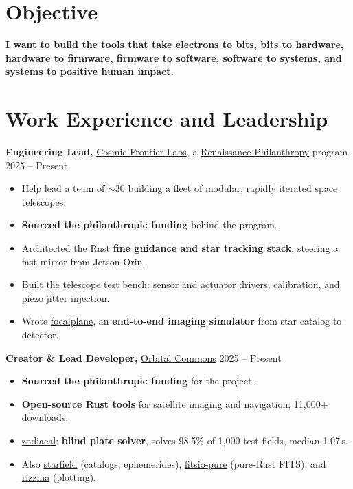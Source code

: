 \documentclass{res}
\let\oldsection\section
\renewcommand{\section}[1]{\needspace{4\baselineskip}\oldsection{#1}}
\begin{document}
\begin{resume}

\section{Objective}
\textbf{I want to build the tools that take electrons to bits, bits to hardware, hardware to firmware, 
firmware to software, software to systems, and systems to positive human impact.}

\section{Work Experience and Leadership}

{\bf Engineering Lead,} \href{https://www.cosmicfrontier.org}{Cosmic Frontier Labs}, a \href{https://www.renaissancephilanthropy.org}{Renaissance Philanthropy} program \hfill
2025 -- Present
\begin{itemize}  \itemsep -2pt
  \item Help lead a team of $\sim$30 building a fleet of modular, rapidly iterated space telescopes.
  \item \textbf{Sourced the philanthropic funding} behind the program.
  \item Architected the Rust \textbf{fine guidance and star tracking stack}, steering a fast mirror from Jetson Orin.
  \item Built the telescope test bench: sensor and actuator drivers, calibration, and piezo jitter injection.
  \item Wrote \href{https://github.com/CosmicFrontierLabs/focalplane}{focalplane}, an \textbf{end-to-end imaging simulator} from star catalog to detector.
\end{itemize}

{\bf Creator \& Lead Developer,} \href{https://github.com/OrbitalCommons}{Orbital Commons} \hfill
2025 -- Present
\begin{itemize}  \itemsep -2pt
  \item \textbf{Sourced the philanthropic funding} for the project.
  \item \textbf{Open-source Rust tools} for satellite imaging and navigation; 11,000+ downloads.
  \item \href{https://github.com/OrbitalCommons/zodiacal}{zodiacal}: \textbf{blind plate solver}, solves 98.5\% of 1,000 test fields, median 1.07\,s.
  \item Also \href{https://github.com/OrbitalCommons/starfield}{starfield} (catalogs, ephemerides), \href{https://github.com/OrbitalCommons/fitsio-pure}{fitsio-pure} (pure-Rust FITS), and \href{https://github.com/OrbitalCommons/rizzma}{rizzma} (plotting).
\end{itemize}


\end{resume}
\end{document}

